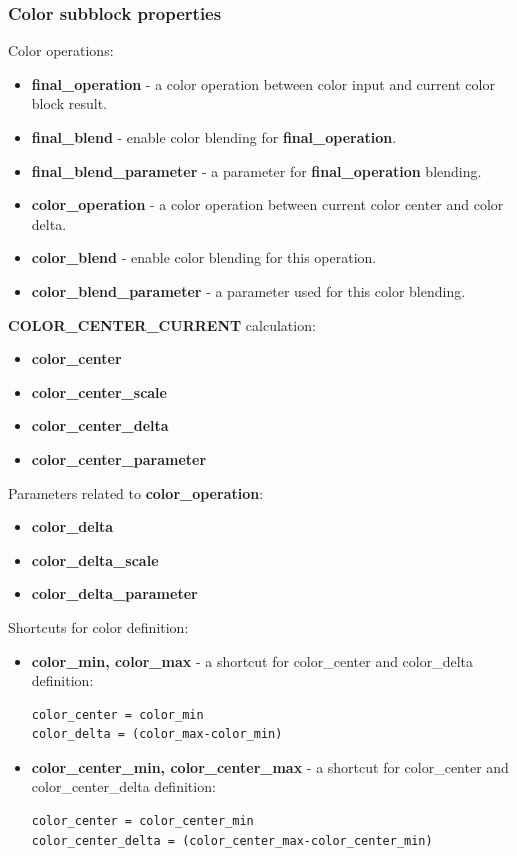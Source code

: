 \documentclass[9pt]{article}
\begin{document}
\subsubsection*{Color subblock properties}
Color operations:
\begin{itemize}
\item{\bf final\_operation} - a color operation between color input and 
current color block result.
\item{\bf final\_blend} - enable color blending for {\bf final\_operation}.
\item{\bf final\_blend\_parameter} - a parameter for {\bf final\_operation} blending.
\item{\bf color\_operation} - a color operation between current color center and
color delta.
\item{\bf color\_blend} - enable color blending for this operation.
\item{\bf color\_blend\_parameter} - a parameter used for this color blending.
\end{itemize}
{\bf COLOR\_CENTER\_CURRENT} calculation:
\begin{itemize}
\item{\bf color\_center}
\item{\bf color\_center\_scale}
\item{\bf color\_center\_delta}
\item{\bf color\_center\_parameter}
\end{itemize}
Parameters related to {\bf color\_operation}:
\begin{itemize}
\item{\bf color\_delta}
\item{\bf color\_delta\_scale}
\item{\bf color\_delta\_parameter}
\end{itemize}
Shortcuts for color definition:
\begin{itemize}
\item{\bf color\_min, color\_max} - a shortcut for color\_center and color\_delta
definition:
\begin{verbatim}
color_center = color_min
color_delta = (color_max-color_min)
\end{verbatim}
\item{\bf color\_center\_min, color\_center\_max} - a shortcut for color\_center
and color\_center\_delta definition:
\begin{verbatim}
color_center = color_center_min
color_center_delta = (color_center_max-color_center_min)
\end{verbatim}
\end{itemize}
\end{document}
